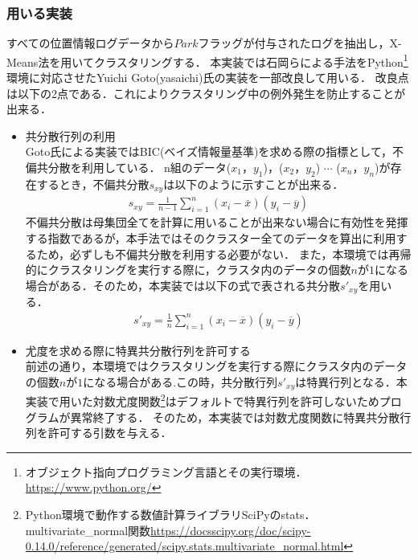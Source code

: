 \subsubsection{用いる実装}
すべての位置情報ログデータから$Park$フラッグが付与されたログを抽出し，X-Means法\cite{Pelleg}を用いてクラスタリングする．
本実装では石岡らによる手法\cite{Ishioka}をPython\footnote{オブジェクト指向プログラミング言語とその実行環境．\url{https://www.python.org/}}環境に対応させたYuichi Goto(yasaichi)氏の実装\cite{Yasaichi}\cite{Yasaichi-git}を一部改良して用いる．
改良点は以下の2点である．これによりクラスタリング中の例外発生を防止することが出来る．
\begin{itemize}
	\item 共分散行列の利用 \\
	      Goto氏による実装\cite{Yasaichi-git}ではBIC(ベイズ情報量基準)を求める際の指標として，不偏共分散を利用している．
	      n組のデータ($x_1$，$y_1$)，($x_2$，$y_2$) $\cdots$ ($x_n$，$y_n$)が存在するとき，不偏共分散$s_{xy}$は以下のように示すことが出来る．\\
	      \begin{align}
	      	s_{xy} = \frac{1}{n - 1} \displaystyle \sum_{i = 1}^n 
	      	{(x_i - \overline{x})(y_{i} - \overline{y})}          
	      \end{align}
	      不偏共分散は母集団全てを計算に用いることが出来ない場合に有効性を発揮する指数であるが\cite{Kyoubunsan-vs-huhenkyoubunsan}，本手法ではそのクラスター全てのデータを算出に利用するため，必ずしも不偏共分散を利用する必要がない．
	      また，本環境では再帰的にクラスタリングを実行する際に，クラスタ内のデータの個数$n$が$1$になる場合がある．そのため，本実装では以下の式で表される共分散$s'_{xy}$を用いる．\\
	      \begin{align}
	      	s'_{xy} = \frac{1}{n} \displaystyle \sum_{i = 1}^n 
	      	{(x_i - \overline{x})(y_{i} - \overline{y})}       
	      \end{align}
	\item 尤度を求める際に特異共分散行列を許可する \\
	      前述の通り，本環境ではクラスタリングを実行する際にクラスタ内のデータの個数$n$が$1$になる場合がある.この時，共分散行列$s'_{xy}$は特異行列となる．本実装で用いた対数尤度関数\footnote{Python環境で動作する数値計算ライブラリSciPyのstats．multivariate\_normal関数\url{https://docsscipy.org/doc/scipy-0.14.0/reference/generated/scipy.stats.multivariate_normal.html}}はデフォルトで特異行列を許可しないためプログラムが異常終了する．
	      そのため，本実装では対数尤度関数に特異共分散行列を許可する引数を与える．
\end{itemize}

